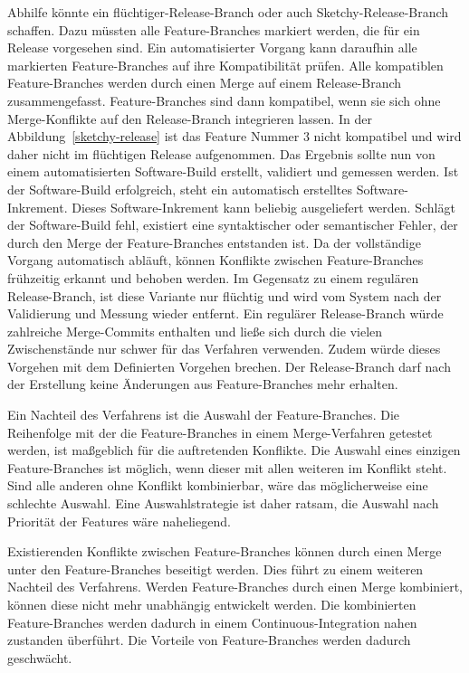 Abhilfe könnte ein \glqq flüchtiger\grqq{}-Release-Branch oder auch \glqq Sketchy\grqq{}-Release-Branch schaffen. Dazu müssten alle Feature-Branches markiert werden, die für ein Release vorgesehen sind. Ein automatisierter Vorgang kann daraufhin alle markierten Feature-Branches auf ihre Kompatibilität prüfen. Alle kompatiblen Feature-Branches werden durch einen Merge auf einem Release-Branch zusammengefasst. Feature-Branches sind dann kompatibel, wenn sie sich ohne Merge-Konflikte auf den Release-Branch integrieren lassen. In der Abbildung~\ref{sketchy-release} ist das Feature Nummer 3 nicht kompatibel und wird daher nicht im flüchtigen Release aufgenommen. Das Ergebnis sollte nun von einem automatisierten Software-Build erstellt, validiert und gemessen werden. Ist der Software-Build erfolgreich, steht ein automatisch erstelltes Software-Inkrement. Dieses Software-Inkrement kann beliebig ausgeliefert werden. Schlägt der Software-Build fehl, existiert eine syntaktischer oder semantischer Fehler, der durch den Merge der Feature-Branches entstanden ist. Da der vollständige Vorgang automatisch abläuft, können Konflikte zwischen Feature-Branches frühzeitig erkannt und behoben werden. Im Gegensatz zu einem regulären Release-Branch, ist diese Variante nur flüchtig und wird vom System nach der Validierung und Messung wieder entfernt. Ein regulärer Release-Branch würde zahlreiche Merge-Commits enthalten und ließe sich durch die vielen Zwischenstände nur schwer für das Verfahren verwenden. Zudem würde dieses Vorgehen mit dem Definierten Vorgehen brechen. Der Release-Branch darf nach der Erstellung keine Änderungen aus Feature-Branches mehr erhalten.

Ein Nachteil des Verfahrens ist die Auswahl der Feature-Branches. Die Reihenfolge mit der die Feature-Branches in einem Merge-Verfahren getestet werden, ist maßgeblich für die auftretenden Konflikte. Die Auswahl eines einzigen Feature-Branches ist möglich, wenn dieser mit allen weiteren im Konflikt steht. Sind alle anderen ohne Konflikt kombinierbar, wäre das möglicherweise eine schlechte Auswahl. Eine Auswahlstrategie ist daher ratsam, die Auswahl nach Priorität der Features wäre naheliegend.

Existierenden Konflikte zwischen Feature-Branches können durch einen Merge unter den Feature-Branches beseitigt werden. Dies führt zu einem weiteren Nachteil des Verfahrens. Werden Feature-Branches durch einen Merge kombiniert, können diese nicht mehr unabhängig entwickelt werden. Die kombinierten Feature-Branches werden dadurch in einem Continuous-Integration nahen zustanden überführt. Die Vorteile von Feature-Branches werden dadurch geschwächt.

